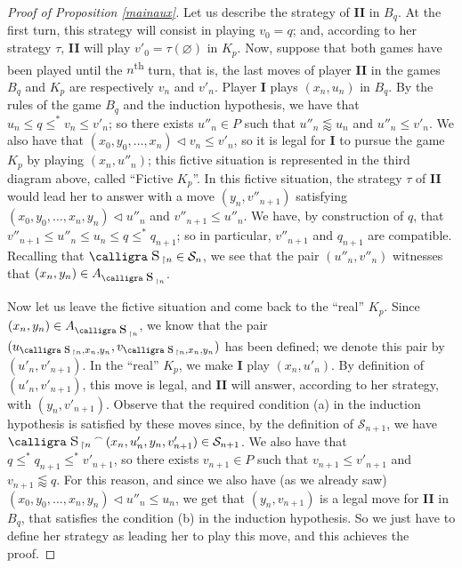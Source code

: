 \documentclass[a4paper,11pt]{article}
\theoremstyle{definition}
\numberwithin{equation}{section}
\newcommand{\St}{\mathcal{S}}
\newcommand{\I}{\textbf{I}}
\newcommand{\II}{\textbf{II}}
\newcommand{\st}{\text{{\calligra \LARGE s}}\,}
\newcommand{\stp}{\text{{\calligra \large s}}\,}
\newcommand{\Asti}[1]{A_{{\text{{\calligra \Large s}}\,}_{#1}}}
\newcommand{\concat}{%
  \mathbin{\raisebox{1ex}{\scalebox{.7}{$\frown$}}}%
}
\begin{document}
\begin{proof}[Proof of Proposition \ref{mainaux}]
Let us describe the strategy of \II{} in $B_q$. At the first turn, this strategy will consist in playing $v_0 = q$; and, according to her strategy $\tau$, \II{} will play $v'_0 = \tau(\varnothing)$ in $K_p$. Now, suppose that both games have been played until the $n$\textsuperscript{th} turn, that is, the last moves of player \II{} in the games $B_q$ and $K_p$ are respectively $v_n$ and $v'_n$.  Player \I{} plays $(x_n, u_n)$ in $B_q$. By the rules of the game $B_q$ and the induction hypothesis, we have that $u_n \leqslant q \leqslant^* v_n \leqslant v'_n$; so there exists $u''_n \in P$ such that $u''_n \lessapprox u_n$ and $u''_n \leqslant v'_n$. We also have that $(x_0, y_0, \ldots, x_n) \vartriangleleft v_n \leqslant v'_n$, so it is legal for \I{} to pursue the game $K_p$ by playing $(x_n, u''_n)$; this fictive situation is represented in the third diagram above, called ``Fictive $K_p$''. In this fictive situation, the strategy $\tau$ of \II{} would lead her to answer with a move $(y_n, v''_{n + 1})$ satisfying $(x_0, y_0, \ldots, x_n, y_n) \vartriangleleft u''_n$ and $v''_{n + 1} \leqslant u''_n$. We have, by construction of $q$, that $v''_{n + 1} \leqslant u''_n \leqslant u_n \leqslant q \leqslant^* q_{n + 1}$; so in particular, $v''_{n + 1}$ and $q_{n + 1}$ are compatible. Recalling that $\st_{\restriction n} \in \St_n$, we see that the pair $(u''_n, v''_n)$ witnesses that $(x_n, y_n) \in \Asti{\restriction n}$.

\smallskip

Now let us leave the fictive situation and come back to the ``real'' $K_p$. Since $(x_n, y_n) \in \Asti{\restriction n}$, we know that the pair $(u_{\stp_{\restriction n}, x_n, y_n}, v_{\stp_{\restriction n}, x_n, y_n})$ has been defined; we denote this pair by $(u'_n, v'_{n + 1})$. In the ``real'' $K_p$, we make \I{} play $(x_n, u'_n)$. By definition of $(u'_n, v'_{n + 1})$, this move is legal, and \II{} will answer, according to her strategy, with $(y_n, v'_{n + 1})$. Observe that the required condition (a) in the induction hypothesis is satisfied by these moves since, by the definition of $\St_{n + 1}$, we have $\st_{\restriction n} \concat (x_n, u'_n, y_n, v'_{n + 1}) \in \St_{n + 1}$. We also have that $q \leqslant^* q_{n + 1} \leqslant^* v'_{n + 1}$, so there exists $v_{n + 1} \in P$ such that $v_{n + 1} \leqslant v'_{n +1}$ and $v_{n + 1} \lessapprox q$. For this reason, and since we also have (as we already saw) $(x_0, y_0, \ldots, x_n, y_n) \vartriangleleft u''_n \leqslant u_n$, we get that $(y_n, v_{n + 1})$ is a legal move for \II{} in $B_q$, that satisfies the condition (b) in the induction hypothesis. So we just have to define her strategy as leading her to play this move, and this achieves the proof.

\nopagebreak

\end{proof}
\end{document}
